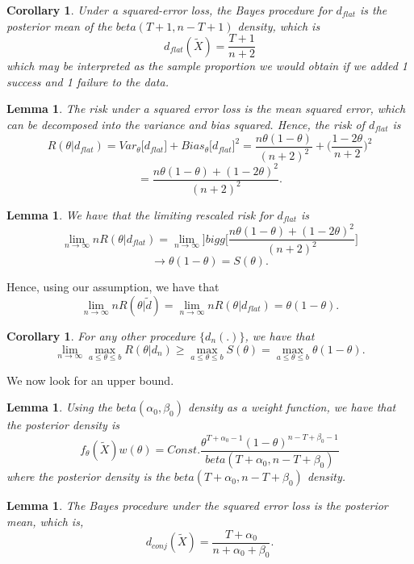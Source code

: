 \documentclass[twoside]{article}
\newtheorem{lemma}[theorem]{Lemma}
\newtheorem{corollary}[theorem]{Corollary}
\begin{document}
\begin{corollary}Under a squared-error loss, the Bayes procedure for $d_{flat}$ is the posterior mean of the $beta(T+1,n-T+1)$ density, which is 
$$
d_{flat}(\tilde{X}) = \frac{T+1}{n+2}
$$
which may be interpreted as the sample proportion we would obtain if we added 1 success and 1 failure to the data.
\end{corollary}

\begin{lemma}The risk under a squared error loss is the mean squared error, which can be decomposed into the variance and bias squared. Hence, the risk of $d_{flat}$ is 
$$
R(\theta|d_{flat}) = Var_{\theta}\bigg[d_{flat}\bigg] + Bias_{\theta}\bigg[d_{flat}\bigg]^2 = \frac{n\theta(1 - \theta)}{(n+2)^2} + \bigg(\frac{1 - 2\theta}{n + 2}\bigg)^2
$$
$$
= \frac{n\theta(1 - \theta) + (1 - 2\theta)^2}{(n+2)^2}.
$$
\end{lemma}

\begin{lemma}We have that the limiting rescaled risk for $d_{flat}$ is 
$$
\lim_{n \rightarrow \infty}nR(\theta|d_{flat}) = \lim_{n \rightarrow \infty} ]bigg[\frac{n\theta(1 - \theta) + (1 - 2\theta)^2}{(n+2)^2} \bigg]
$$
$$
\rightarrow \theta(1-\theta) = S(\theta).
$$
\end{lemma}

Hence, using our assumption, we have that 
$$
\lim_{n \rightarrow \infty}nR(\theta|\tilde{d}) = \lim_{n \rightarrow \infty}nR(\theta|d_{flat}) = \theta(1 - \theta).
$$

\begin{corollary}For any other procedure $\{d_n(.)\}$, we have that 
$$
\lim_{n \rightarrow \infty}\max_{a \leq \theta \leq b}R(\theta|d_n) \geq \max_{a \leq \theta \leq b}S(\theta) = \max_{a \leq \theta \leq b}\theta(1 - \theta).
$$
\end{corollary}

We now look for an upper bound. 
\begin{lemma}Using the $beta(\alpha_0, \beta_0)$ density as a weight function, we have that the posterior density is 
$$
f_{\theta}(\tilde{X})w(\theta) = Const. \frac{\theta^{T+\alpha_0 - 1}(1 - \theta)^{n - T + \beta_0 - 1}}{beta(T + \alpha_0, n - T + \beta_0)}
$$
where the posterior density is the $beta(T + \alpha_0, n - T + \beta_0)$ density.
\end{lemma}

\begin{lemma}The Bayes procedure under the squared error loss is the posterior mean, which is,
$$
d_{conj}(\tilde{X}) = \frac{T + \alpha_0}{n + \alpha_0 + \beta_0}.
$$
\end{lemma}
\end{document}
